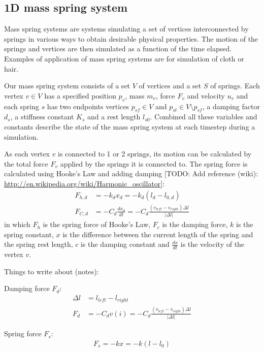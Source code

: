 \documentclass[twoside]{article}
\providecommand{\abs}[1]{\left \lvert #1 \right \rvert}
\begin{document}
\begin{multicols}{2}
\subsection{1D mass spring system}
Mass spring systems are systems simulating a set of vertices interconnected by
springs in various ways to obtain desirable physical properties. The motion of
the springs and vertices are then simulated as a function of the time elapsed.
Examples of application of mass spring systems are for simulation of cloth or
hair.

Our mass spring system consists of a set $V$ of vertices and a set $S$ of
springs. Each vertex $v \in V$ has a specified position $p_v$, mass $m_v$, force
$F_v$
and velocity $u_v$ and each spring $s$ has two endpoints vertices $p_{sf} \in V$
and $p_{st} \in V \setminus p_{sf}$, a damping factor $d_s$, a stiffness
constant $K_s$ and a rest length $l_{s0}$. Combined all these variables and
constants describe the state of the mass spring system at each timestep during a
simulation.

As each vertex $v$ is connected to 1 or 2 springs, its motion can be calculated by
the total force $F_v$ applied by the springs it is connected to. The spring
force is calculated using Hooke's Law and adding damping [TODO: Add reference (wiki):
    \url{http://en.wikipedia.org/wiki/Harmonic_oscillator}]:
\begin{align}
    \label{eq:hooke}
    F_{h,d} &= -k_d x_d = -k_d (l_d - l_{0,d}) \\
    \label{eq:damping}
    F_{C,d} &= -C_d \frac{dx_d}{dt} = - C_d \frac{\left(v_{left} - v_{right}\right)
\Delta l}{\abs{\Delta l}}
\end{align}
in which $F_h$ is the spring force of Hooke's Law, $F_c$ is the damping force,
$k$ is the spring constant, $x$ is the difference between the current length of
the spring and the spring rest length, $c$ is the damping constant and
$\frac{dx}{dt}$ is the velocity of the vertex $v$.

Things to write about (notes):

Damping force $F_d$:
\begin{align}
    \Delta l &= l_{left} - l_{right} \\
    F_d      &= - C_d v(i) =  - C_d \frac{\left(v_{left} - v_{right}\right)
\Delta l}{\abs{\Delta l}}
\end{align}

Spring force $F_s$:
\begin{align}
    F_s = -kx = -k \left( l - l_0 \right)
\end{align}


\end{multicols}
\end{document}
